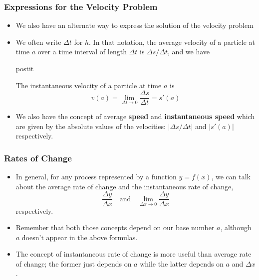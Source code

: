 \documentclass[serif,ignorenonframetext]{beamer}
\begin{document}
\begin{frame}
  \frametitle{Expressions for the Velocity Problem}
  \begin{itemize}
  \item We also have an alternate way to express the solution of the
    velocity problem
  \pause
  \item We often write $\Delta t$ for $h$.  In that notation, the average
    velocity of a particle at time $a$ over a time interval of length
    $\Delta t$ is $\Delta s/\Delta t$, and we have

  \begin{beamercolorbox}{postit}

    The instantaneous velocity of a particle at time $a$ is
    \begin{displaymath}
      v(a) = \lim_{\Delta t\to 0} \frac{\Delta s}{\Delta t} = s'(a)
    \end{displaymath}

  \end{beamercolorbox}

  \pause
  \item We also have the concept of average \textbf{speed} and
    \textbf{instantaneous speed} which are given by the absolute values
    of the velocities: $|\Delta s/\Delta t|$ and $|s'(a)|$ respectively.
  \end{itemize}
\end{frame}

\begin{frame}
  \frametitle{Rates of Change}
  \begin{itemize}
  \item In general, for any process represented by a function $y=f(x)$,
    we can talk about the average rate of change and the instantaneous
    rate of change,
    \begin{displaymath}
      \frac{\Delta y}{\Delta x} \quad\mbox{and}\quad 
      \lim_{\Delta x\to 0} \frac{\Delta y}{\Delta x}
    \end{displaymath}
    respectively.
  \pause
  \item Remember that both those concepts depend on our base number
    $a$, although $a$ doesn't appear in the above formulas.
  \pause
  \item The concept of instantaneous rate of change is more useful
    than average rate of change; the former just depends on $a$ while the
    latter depends on $a$ and $\Delta x$.
  \end{itemize}
\end{frame}
\end{document}
